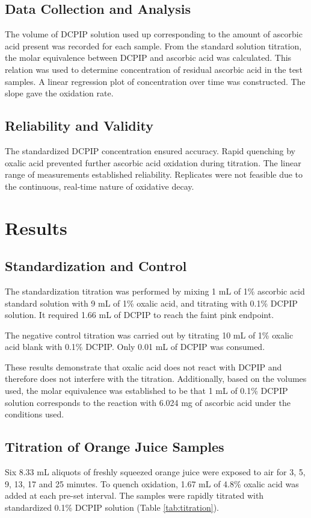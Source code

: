 \documentclass[]{report}
\begin{document}
\begin{multicols}{2}
\subsection{Data Collection and Analysis}
The volume of DCPIP solution used up corresponding to the amount of ascorbic acid present was recorded for each sample. From the standard solution titration, the molar equivalence between DCPIP and ascorbic acid was calculated. This relation was used to determine concentration of residual ascorbic acid in the test samples. A linear regression plot of concentration over time was constructed. The slope gave the oxidation rate.

\subsection{Reliability and Validity}
The standardized DCPIP concentration ensured accuracy. Rapid quenching by oxalic acid prevented further ascorbic acid oxidation during titration. The linear range of measurements established reliability. Replicates were not feasible due to the continuous, real-time nature of oxidative decay.

\section{Results}
\subsection{Standardization and Control}
The standardization titration was performed by mixing 1 mL of 1\% ascorbic acid standard solution with 9 mL of 1\% oxalic acid, and titrating with 0.1\% DCPIP solution. It required 1.66 mL of DCPIP to reach the faint pink endpoint.

The negative control titration was carried out by titrating 10 mL of 1\% oxalic acid blank with 0.1\% DCPIP. Only 0.01 mL of DCPIP was consumed.

These results demonstrate that oxalic acid does not react with DCPIP and therefore does not interfere with the titration. Additionally, based on the volumes used, the molar equivalence was established to be that 1 mL of 0.1\% DCPIP solution corresponds to the reaction with 6.024 mg of ascorbic acid under the conditions used.

\subsection{Titration of Orange Juice Samples}
Six 8.33 mL aliquots of freshly squeezed orange juice were exposed to air for 3, 5, 9, 13, 17 and 25 minutes. To quench oxidation, 1.67 mL of 4.8\% oxalic acid was added at each pre-set interval. The samples were rapidly titrated with standardized 0.1\% DCPIP solution (Table \ref{tab:titration}).


\end{multicols}
\end{document}
